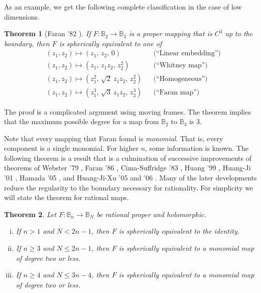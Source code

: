\documentclass[12pt,openany]{book}
\newcommand{\bB}{{\mathbb{B}}}
\theoremstyle{plain}
\newtheorem{thm}{Theorem}[section]
\theoremstyle{remark}
\theoremstyle{definition}
\theoremstyle{exercise}
\theoremstyle{example}
\begin{document}
As an example, we get the following complete classification in the
case of low dimensions.

\begin{thm}[Faran '82 \cite{FaranB2B3}]
If $F \colon \bB_2 \to \bB_3$
is a proper mapping that is $C^3$ up to the boundary,
then $F$ is spherically equivalent to one of
\begin{align*}
& (z_1,z_2) \mapsto (z_1, \, z_2, \, 0) & & \text{(``Linear embedding'')} \\
& (z_1,z_2) \mapsto (z_1, \, z_1z_2, \, z_2^2) & & \text{(``Whitney map'')} \\
& (z_1,z_2) \mapsto (z_1^2, \, \sqrt{2}~z_1z_2, \, z_2^2) & &
\text{(``Homogeneous'')} \\
& (z_1,z_2) \mapsto (z_1^3, \, \sqrt{3}~z_1z_2, \, z_2^3) & & \text{(``Faran
map'')}
\end{align*}
\end{thm}

The proof is a complicated argument using moving frames.  The theorem
implies that the
maximum possible degree for a map from $\bB_2$ to $\bB_3$ is 3.

Note that every mapping that Faran found
is \emph{monomial}.  That is, every component is a
single monomial.  For higher $n$, some information is known.  The following
theorem is a result that is a culmination of successive improvements of
theorems of Webster '79 \cite{Webster79},
Faran '86 \cite{Faran86}, Cima-Suffridge '83 \cite{CS83},
Huang '99 \cite{Huang99}, Huang-Ji '01 \cite{HJ01}, Hamada '05 \cite{Hamada},
and Huang-Ji-Xu '05 and '06 \cite{HJX}.
Many
of the later developments
reduce the regularity to the boundary
necessary for rationality.
For simplicity we will state the theorem for rational maps.

\begin{thm}
Let $F \colon \bB_n \to \bB_N$ be rational proper and holomorphic.
\begin{enumerate}[(i)]
\item If $n > 1$ and $N < 2n-1$, then $F$ is spherically
equivalent to the identity.
\item If $n \geq 3$ and $N \leq 2n-1$, then $F$ is spherically
equivalent to a monomial map of degree two or less.
\item If $n \geq 4$ and $N \leq 3n-4$, then $F$ is spherically
equivalent to a monomial map of degree two or less.
\end{enumerate}
\end{thm}
\end{document}
